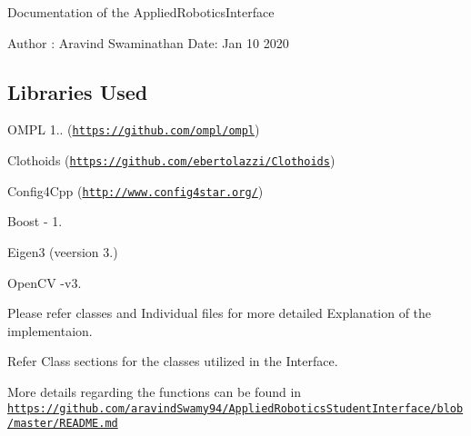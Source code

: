 Documentation of the Applied\+Robotics\+Interface

Author \+: Aravind Swaminathan Date\+: Jan 10 2020

\subsection*{Libraries Used}


\begin{DoxyItemize}
\item O\+M\+PL 1.. (\href{https://github.com/ompl/ompl}{\tt https\+://github.\+com/ompl/ompl})
\item Clothoids (\href{https://github.com/ebertolazzi/Clothoids}{\tt https\+://github.\+com/ebertolazzi/\+Clothoids})
\item Config4\+Cpp (\href{http://www.config4star.org/}{\tt http\+://www.\+config4star.\+org/})
\item Boost -\/ 1.
\item Eigen3 (veersion 3.)
\item Open\+CV -\/v3.
\end{DoxyItemize}

Please refer classes and Individual files for more detailed Explanation of the implementaion.

Refer Class sections for the classes utilized in the Interface.

More details regarding the functions can be found in \href{https://github.com/aravindSwamy94/AppliedRoboticsStudentInterface/blob/master/README.md}{\tt https\+://github.\+com/aravind\+Swamy94/\+Applied\+Robotics\+Student\+Interface/blob/master/\+R\+E\+A\+D\+M\+E.\+md} 